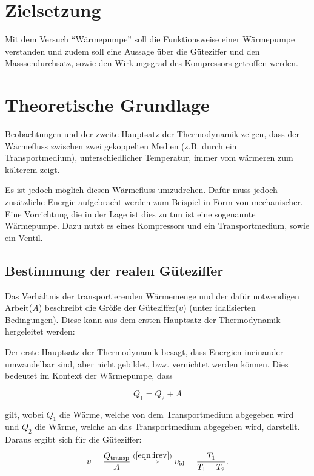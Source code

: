 


    \tableofcontents
    
    \newpage
    \section{Zielsetzung}
    Mit dem Versuch "`Wärmepumpe"' soll die Funktionsweise einer Wärmepumpe verstanden und zudem soll eine Aussage über die Güteziffer und den Masssendurchsatz,
    sowie den Wirkungsgrad des Kompressors getroffen werden.

    \section{Theoretische Grundlage}
    Beobachtungen und der zweite Hauptsatz der Thermodynamik zeigen, dass der Wärmefluss zwischen zwei gekoppelten Medien (z.B. durch ein Transportmedium), unterschiedlicher Temperatur, immer vom wärmeren zum kälterem zeigt.

    Es ist jedoch möglich diesen Wärmefluss umzudrehen. Dafür muss jedoch zusätzliche Energie aufgebracht werden zum Beispiel in Form von mechanischer. Eine Vorrichtung die in der Lage ist dies zu tun ist 
    eine sogenannte Wärmepumpe. Dazu nutzt es eines Kompressors und ein Transportmedium, sowie ein Ventil. 

        \subsection{Bestimmung der realen Güteziffer}
    	Das Verhältnis der transportierenden Wärmemenge und der dafür notwendigen Arbeit($A$) beschreibt die Größe der Güteziffer($\upsilon$) (unter idalisierten Bedingungen).
        Diese kann aus dem ersten Hauptsatz der Thermodynamik hergeleitet werden:

        Der erste Hauptsatz der Thermodynamik besagt, dass Energien ineinander umwandelbar sind, aber nicht gebildet, bzw. vernichtet werden können. 
        Dies bedeutet im Kontext der Wärmepumpe, dass

        \begin{equation}
            Q_1 = Q_2 + A
            \label{eqn:Th1}
        \end{equation}

        gilt, wobei $Q_1$ die Wärme, welche von dem Transportmedium abgegeben wird und $Q_2$ die Wärme, welche an das Transportmedium abgegeben wird, darstellt. Daraus ergibt sich für die Güteziffer:
        \begin{equation}
            \upsilon = \frac{Q_\text{transp}}{A} \stackrel{(\ref{eqn:irev})}{\implies} \upsilon_\text{id} = \frac{T_1}{T_1 - T_2}.
            \label{eqn:Gueteziffer}
        \end{equation}

